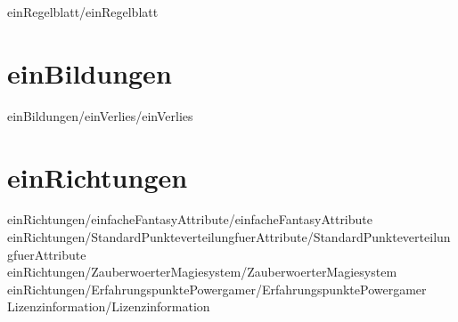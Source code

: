 
 {einRegelblatt/einRegelblatt}
\chapter {einBildungen}
 {einBildungen/einVerlies/einVerlies}
\chapter {einRichtungen}
 {einRichtungen/einfacheFantasyAttribute/einfacheFantasyAttribute}
 {einRichtungen/StandardPunkteverteilungfuerAttribute/StandardPunkteverteilungfuerAttribute}
 {einRichtungen/ZauberwoerterMagiesystem/ZauberwoerterMagiesystem}
 {einRichtungen/ErfahrungspunktePowergamer/ErfahrungspunktePowergamer}
 {Lizenzinformation/Lizenzinformation}

